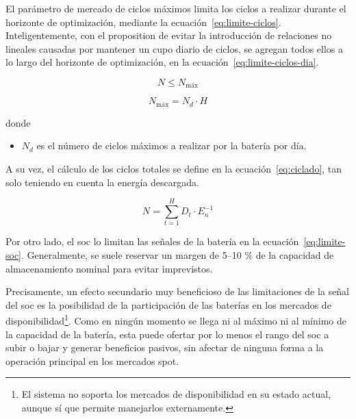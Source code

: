El parámetro de mercado de ciclos máximos limita los ciclos a realizar durante el horizonte de optimización, mediante la ecuación~\ref{eq:limite-ciclos}. Inteligentemente, con el proposition de evitar la introducción de relaciones no lineales causadas por mantener un cupo diario de ciclos, se agregan todos ellos a lo largo del horizonte de optimización, en la ecuación~\ref{eq:limite-ciclos-dia}.

\begin{equation}%
  \label{eq:limite-ciclos}
  N \le N_{\text{máx}}
\end{equation}

\begin{samepage}

  \begin{equation}%
    \label{eq:limite-ciclos-dia}
    N_{\text{máx}} = N_{d} \cdot H
  \end{equation}

  donde

  \begin{itemize}

    \item \( N_{d} \) es el número de ciclos máximos a realizar por la batería por día.

  \end{itemize}

\end{samepage}

A su vez, el cálculo de los ciclos totales se define en la ecuación~\ref{eq:ciclado}, tan solo teniendo en cuenta la energía descargada.

\begin{equation}%
  \label{eq:ciclado}
  N = \sum_{t = 1}^{H} D_{t} \cdot E_{n}^{-1}
\end{equation}

Por otro lado, el \gls{soc} lo limitan las señales de la batería en la ecuación~\ref{eq:limite-soc}. Generalmente, se suele reservar un margen de 5--10 \% de la capacidad de almacenamiento nominal para evitar imprevistos.

Precisamente, un efecto secundario muy beneficioso de las limitaciones de la señal del \gls{soc} es la posibilidad de la participación de las baterías en los mercados de disponibilidad\footnote{El sistema no soporta los mercados de disponibilidad en su estado actual, aunque sí que permite manejarlos externamente.}. Como en ningún momento se llega ni al máximo ni al mínimo de la capacidad de la batería, esta puede ofertar por lo menos el rango del \gls{soc} a subir o bajar y generar beneficios pasivos, sin afectar de ninguna forma a la operación principal en los mercados spot.

